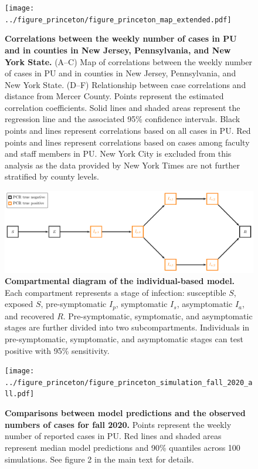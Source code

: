 \documentclass[12pt]{article}
\begin{document}
\pagebreak

\begin{figure}[!htp]
\texttt{[image: ../figure\_princeton/figure\_princeton\_map\_extended.pdf]}
\caption{
\textbf{Correlations between the weekly number of cases in PU and in counties in New Jersey, Pennsylvania, and New York State.}
(A--C) Map of correlations between the weekly number of cases in PU and in counties in New Jersey, Pennsylvania, and New York State.
(D--F) Relationship between case correlations and distance from Mercer County.
Points represent the estimated correlation coefficients.
Solid lines and shaded areas represent the regression line and the associated 95\% confidence intervals.
Black points and lines represent correlations based on all cases in PU.
Red points and lines represent correlations based on cases among faculty and staff members in PU.
New York City is excluded from this analysis as the data provided by New York Times are not further stratified by county levels.
}
\end{figure}


\pagebreak

\begin{figure}[!htp]
\includegraphics[width=\textwidth]{../figure_diagram/diagram.pdf}
\caption{
\textbf{Compartmental diagram of the individual-based model.}
Each compartment represents a stage of infection: susceptible $S$, exposed $S$, pre-symptomatic $I_p$, symptomatic $I_s$, asymptomatic $I_a$, and recovered $R$.
Pre-symptomatic, symptomatic, and asymptomatic stages are further divided into two subcompartments.
Individuals in pre-symptomatic, symptomatic, and asymptomatic stages can test positive with 95\% sensitivity.
}
\end{figure}

\pagebreak

\begin{figure}[!htp]
\texttt{[image: ../figure\_princeton/figure\_princeton\_simulation\_fall\_2020\_all.pdf]}
\caption{
\textbf{Comparisons between model predictions and the observed numbers of cases for fall 2020.}
Points represent the weekly number of reported cases in PU.
Red lines and shaded areas represent median model predictions and 90\% quantiles across 100 simulations.
See figure 2 in the main text for details.
}
\end{figure}
\end{document}
